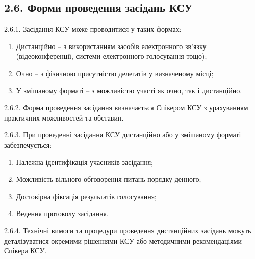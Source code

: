 \subsection*{2.6. Форми проведення засідань КСУ}
    2.6.1. Засідання КСУ може проводитися у таких формах:

        \begin{enumerate}[label=\alph*)]
            \item Дистанційно -- з використанням засобів електронного зв'язку (відеоконференції, системи електронного голосування тощо);
            \item Очно -- з фізичною присутністю делегатів у визначеному місці;
            \item У змішаному форматі -- з можливістю участі як очно, так і дистанційно.
        \end{enumerate}

    2.6.2. Форма проведення засідання визначається Спікером КСУ з урахуванням практичних можливостей та обставин.

    2.6.3. При проведенні засідання КСУ дистанційно або у змішаному форматі забезпечується:

        \begin{enumerate}[label=\alph*)]
            \item Належна ідентифікація учасників засідання;
            \item Можливість вільного обговорення питань порядку денного;
            \item Достовірна фіксація результатів голосування;
            \item Ведення протоколу засідання.
        \end{enumerate}

    2.6.4. Технічні вимоги та процедури проведення дистанційних засідань можуть деталізуватися окремими рішеннями КСУ або методичними рекомендаціями Спікера КСУ.